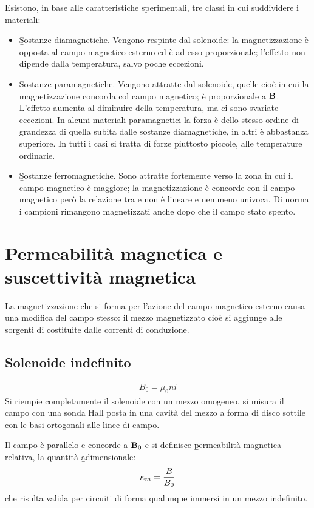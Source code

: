 Esistono, in base alle caratteristiche sperimentali, tre classi in cui suddividere i materiali:
\begin{itemize}
\item \b{Sostanze diamagnetiche}. Vengono respinte dal solenoide: la magnetizzazione \dM è opposta al campo magnetico esterno \dB ed è ad esso proporzionale; l'effetto non dipende dalla temperatura, salvo poche eccezioni.
\item \b{Sostanze paramagnetiche}. Vengono attratte dal solenoide, quelle cioè in cui la magnetizzazione concorda col campo magnetico; \dM è proporzionale a $\mathbf{B}$. L'effetto aumenta al diminuire della temperatura, ma ci sono svariate eccezioni. In alcuni materiali paramagnetici la forza è dello stesso ordine di grandezza di quella subita dalle sostanze diamagnetiche, in altri è abbastanza superiore. In tutti i casi si tratta di forze piuttosto piccole, alle temperature ordinarie.
\item \b{Sostanze ferromagnetiche}. Sono attratte fortemente verso la zona in cui il campo magnetico è maggiore; la magnetizzazione è concorde con il campo magnetico però la relazione tra \dM e \dB non è lineare e nemmeno univoca. Di norma i campioni rimangono magnetizzati anche dopo che il campo stato spento.
\end{itemize}

\section{Permeabilità magnetica e suscettività magnetica}%
La magnetizzazione \dM che si forma per l'azione del campo magnetico esterno causa una modifica del campo stesso: il mezzo magnetizzato cioè si aggiunge alle sorgenti di \dB costituite dalle correnti di conduzione.

\subsection{Solenoide indefinito}
\begin{equation}\begin{split}
B_0=\mu_0ni
\end{split}\end{equation}
Si riempie completamente il solenoide con un mezzo omogeneo, si misura il campo \dB con una sonda Hall posta in una cavità del mezzo a forma di disco sottile con le basi ortogonali alle linee di campo.

Il campo \dB è parallelo e concorde a $\mathbf{B}_0$ e si definisce \b{permeabilità magnetica relativa}, la quantità \b{adimensionale}:
\begin{equation}\begin{split}
\kappa_m=\frac{B}{B_0}
\end{split}\end{equation}
che risulta valida per circuiti di forma qualunque immersi in un mezzo indefinito.

